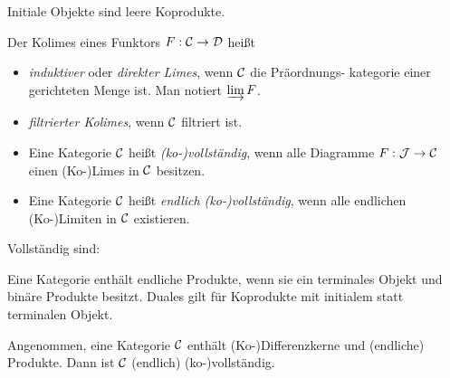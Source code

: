 \documentclass{cheat-sheet}
\begin{document}
\begin{bem}
  Initiale Objekte sind leere Koprodukte.
\end{bem}

\begin{defn}
  Der Kolimes eines Funktors $F : \mathcal{C} \to \mathcal{D}$ heißt
  \begin{itemize}
    \item \emph{induktiver} oder \emph{direkter Limes}, wenn $\mathcal{C}$ die Präordnungs- kategorie einer gerichteten Menge ist. Man notiert $\varinjlim F$.
    \item \emph{filtrierter Kolimes}, wenn $\mathcal{C}$ filtriert ist.
  \end{itemize}
\end{defn}

\begin{defn}
  \begin{itemize}
    \item Eine Kategorie $\mathcal{C}$ heißt \emph{(ko-)vollständig}, wenn alle Diagramme $F : \mathcal{J} \to \mathcal{C}$ einen (Ko-)Limes in $\mathcal{C}$ besitzen.
    \item Eine Kategorie $\mathcal{C}$ heißt \emph{endlich (ko-)vollständig}, wenn alle endlichen (Ko-)Limiten in $\mathcal{C}$ existieren.
  \end{itemize}
\end{defn}

\begin{bspe}
  Vollständig sind: \enspace
  \inlineitem{$\SetC$,}
  \inlineitem{$\Grp$,}
  \inlineitem{$\AbGrp$,}
  \inlineitem{$\Top$,}
\end{bspe}

\begin{lem}
  Eine Kategorie enthält endliche Produkte, wenn sie ein terminales Objekt und binäre Produkte besitzt.
  Duales gilt für Koprodukte mit initialem statt terminalen Objekt.
\end{lem}

\begin{satz}
  Angenommen, eine Kategorie $\mathcal{C}$ enthält (Ko-)Differenzkerne und (endliche) Produkte.
  Dann ist $\mathcal{C}$ (endlich) (ko-)vollständig.
\end{satz}

\iffalse
  \begin{kor}
    In $\SetC$ existieren alle endlichen Limiten und Kolimiten.
  \end{kor}
\fi
\end{document}
